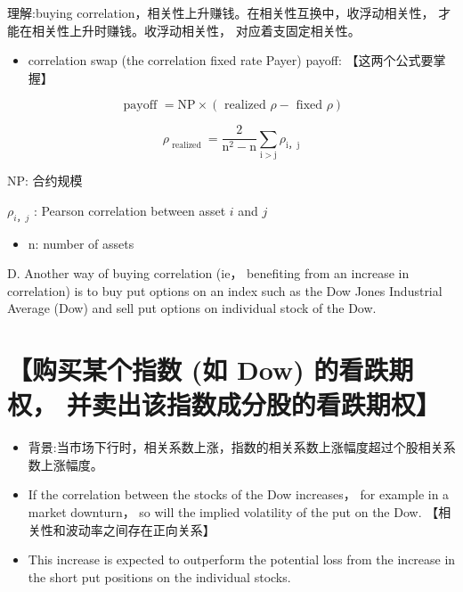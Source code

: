 理解:buying correlation，相关性上升赚钱。在相关性互换中，收浮动相关性， 才能在相关性上升时赚钱。收浮动相关性， 对应着支固定相关性。

\begin{itemize}
\item correlation swap (the correlation fixed rate Payer) payoff: 【这两个公式要掌握】
\end{itemize}

\[
\text{ payoff } = \mathrm{{NP}} \times  \left( {\text{ realized }\rho  - \text{ fixed }\rho }\right)
\]

\[
{\rho }_{\text{ realized }} = \frac{2}{{\mathrm{n}}^{2} - \mathrm{n}}\mathop{\sum }\limits_{{\mathrm{i} > \mathrm{j}}}{\rho }_{\mathrm{i}，\mathrm{j}}
\]

 NP: 合约规模

 \({\rho }_{i，j}\) : Pearson correlation between asset \(i\) and \(j\)

\begin{itemize}
\item n: number of assets
\end{itemize}

D. Another way of buying correlation (ie， benefiting from an increase in correlation) is to buy put options on an index such as the Dow Jones Industrial Average (Dow) and sell put options on individual stock of the Dow.

\section*{【购买某个指数 (如 Dow) 的看跌期权， 并卖出该指数成分股的看跌期权】}

\begin{itemize}
\item 背景:当市场下行时，相关系数上涨，指数的相关系数上涨幅度超过个股相关系数上涨幅度。
\end{itemize}

\begin{itemize}
\item If the correlation between the stocks of the Dow increases， for example in a market downturn， so will the implied volatility of the put on the Dow. 【相关性和波动率之间存在正向关系】
\end{itemize}

\begin{itemize}
\item This increase is expected to outperform the potential loss from the increase in the short put positions on the individual stocks.
\end{itemize}

